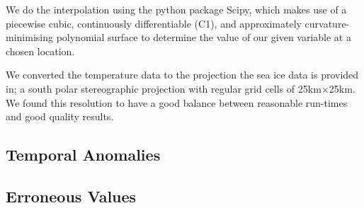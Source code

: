 \documentclass[../main.tex]{subfiles}
\begin{document}
We do the interpolation using the python package Scipy, which makes use of a piecewise cubic, continuously differentiable (C1), and approximately curvature-minimising polynomial surface to determine the value of our given variable at a chosen location. 

We converted the temperature data to the projection the sea ice data is provided in; a south polar stereographic projection with regular grid cells of 25km$\times$25km. We found this resolution to have a good balance between reasonable run-times and good quality results.

\subsection*{Temporal Anomalies}
\subsection*{Erroneous Values}
\end{document}
